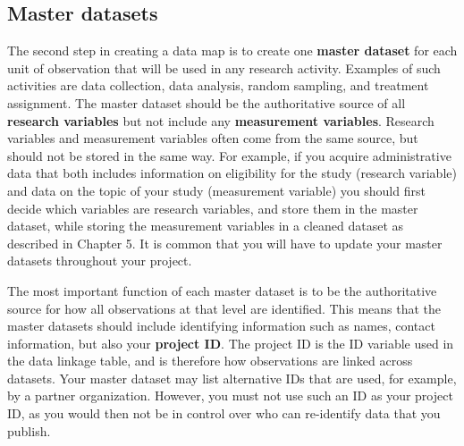 \subsection{Master datasets}

The second step in creating a data map is to create one \textbf{master dataset}
for each unit of observation that will be used in any research activity.
Examples of such activities are data collection, data analysis,
random sampling, and treatment assignment.
The master dataset should be the authoritative source of
all \textbf{research variables}
but not include any \textbf{measurement variables}.
Research variables and measurement variables
often come from the same source,
but should not be stored in the same way.
For example, if you acquire administrative data that both includes
information on eligibility for the study (research variable)
and data on the topic of your study (measurement variable)
you should first decide which variables are research variables,
and store them in the master dataset,
while storing the measurement variables in a cleaned dataset
as described in Chapter 5.
It is common that you will have to update
your master datasets throughout your project.

The most important function of each master dataset
is to be the authoritative source
for how all observations at that level are identified.
This means that the master datasets should include
identifying information such as names, contact information,
but also your \textbf{project ID}.
The project ID is the ID variable used in the data linkage table,
and is therefore how observations are linked across datasets.
Your master dataset may list alternative IDs that are used,
for example, by a partner organization.
However, you must not use such an ID as your project ID,
as you would then not be in control over
who can re-identify data that you publish.

